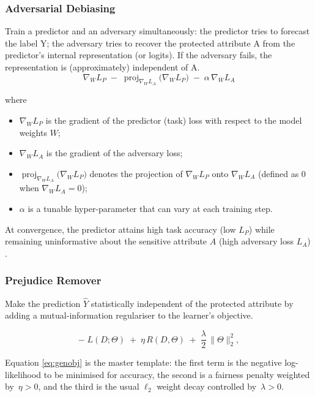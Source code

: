 \documentclass[12pt,a4paper,openright,twoside]{book}
\begin{document}
\subsubsection{Adversarial Debiasing} Train a predictor and an adversary simultaneously: the predictor tries to forecast the label Y; the adversary tries to recover the protected attribute A from the predictor’s internal representation (or logits). If the adversary fails, the representation is (approximately) independent of A.
\begin{equation}
  \nabla_W L_P
  \;-\;
  \operatorname{proj}_{\nabla_W L_A}\!\bigl(\nabla_W L_P\bigr)
  \;-\;
  \alpha\,\nabla_W L_A
\end{equation}

where
\begin{itemize}
  \item $\nabla_W L_P$ is the gradient of the predictor (task) loss with respect to the model weights $W$;
  \item $\nabla_W L_A$ is the gradient of the adversary loss;
  \item $\operatorname{proj}_{\nabla_W L_A}\!\bigl(\nabla_W L_P\bigr)$ denotes the projection of $\nabla_W L_P$ onto $\nabla_W L_A$ (defined as $0$ when $\nabla_W L_A = 0$);
  \item $\alpha$ is a tunable hyper-parameter that can vary at each training step.
\end{itemize}
At convergence, the predictor attains high task accuracy (low $L_P$) while remaining uninformative about the sensitive attribute $A$ (high adversary loss $L_A$) \cite{zhang2018mitigatingunwantedbiasesadversarial}.
\subsubsection{Prejudice Remover} Make the prediction \begin{math}\widehat{Y}\end{math} statistically independent of the protected attribute by adding a mutual-information regulariser to the learner’s objective.


\begin{equation}
-\;L(D;\Theta)\;+\;\eta\,R(D,\Theta)\;+\;
\frac{\lambda}{2}\,\lVert\Theta\rVert_{2}^{2},
\tag{7}\label{eq:genobj}
\end{equation}

\noindent
Equation \eqref{eq:genobj} is the master template: the first term is the negative log-likelihood to be minimised for accuracy, the second is a fairness penalty weighted by~\(\eta>0\), and the third is the usual \(\ell_{2}\) weight decay controlled by~\(\lambda>0\).
\end{document}
